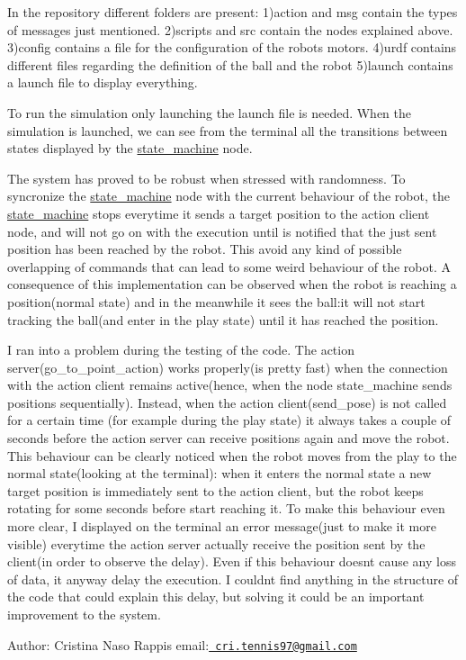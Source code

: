 In the repository different folders are present\+: 1)action and msg contain the types of messages just mentioned. 2)scripts and src contain the nodes explained above. 3)config contains a file for the configuration of the robot\textquotesingle{}s motors. 4)urdf contains different files regarding the definition of the ball and the robot 5)launch contains a launch file to display everything.

To run the simulation only launching the launch file is needed. When the simulation is launched, we can see from the terminal all the transitions between states displayed by the \mbox{\hyperlink{namespacestate__machine}{state\+\_\+machine}} node.

The system has proved to be robust when stressed with randomness. To syncronize the \mbox{\hyperlink{namespacestate__machine}{state\+\_\+machine}} node with the current behaviour of the robot, the \mbox{\hyperlink{namespacestate__machine}{state\+\_\+machine}} stops everytime it sends a target position to the action client node, and will not go on with the execution until is notified that the just sent position has been reached by the robot. This avoid any kind of possible overlapping of commands that can lead to some weird behaviour of the robot. A consequence of this implementation can be observed when the robot is reaching a position(normal state) and in the meanwhile it sees the ball\+:it will not start tracking the ball(and enter in the play state) until it has reached the position.

I ran into a problem during the testing of the code. The action server(go\+\_\+to\+\_\+point\+\_\+action) works properly(is pretty fast) when the connection with the action client remains active(hence, when the node state\+\_\+machine sends positions sequentially). Instead, when the action client(send\+\_\+pose) is not called for a certain time (for example during the play state) it always takes a couple of seconds before the action server can receive positions again and move the robot. This behaviour can be clearly noticed when the robot moves from the play to the normal state(looking at the terminal)\+: when it enters the normal state a new target position is immediately sent to the action client, but the robot keeps rotating for some seconds before start reaching it. To make this behaviour even more clear, I displayed on the terminal an error message(just to make it more visible) everytime the action server actually receive the position sent by the client(in order to observe the delay). Even if this behaviour doesn\textquotesingle{}t cause any loss of data, it anyway delay the execution. I couldn\textquotesingle{}t find anything in the structure of the code that could explain this delay, but solving it could be an important improvement to the system.

Author\+: Cristina Naso Rappis email\+:\href{mailto:cri.tennis97@gmail.com}{\texttt{ cri.\+tennis97@gmail.\+com}} 